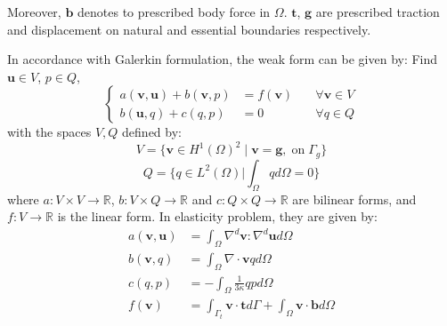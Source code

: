 Moreover, $\boldsymbol b$ denotes to prescribed body force in $\Omega$. $\boldsymbol t$, $\boldsymbol g$ are prescribed traction and displacement on natural and essential boundaries respectively. 

In accordance with Galerkin formulation, the weak form can be given by: 
Find $\boldsymbol u \in V$, $p \in Q$,
\begin{equation}\label{weak_form}
\left \{
\begin{aligned}
    a(\boldsymbol v, \boldsymbol u) + b(\boldsymbol v, p) &= f(\boldsymbol v) \quad &\forall \boldsymbol v \in V \\
    b(\boldsymbol u, q) + c(q,p) &= 0 \quad &\forall q \in Q
\end{aligned}
\right .
\end{equation}
with the spaces $V, Q$ defined by:
\begin{equation}\label{mix_formulation}
V=\{\boldsymbol v \in H^1(\Omega)^2\;\vert\;\boldsymbol v = \boldsymbol g, \; \textrm{on} \; \Gamma_g\}
\end{equation}
\begin{equation}
Q = \{q \in L^2(\Omega) \vert \int_{\Omega} q d\Omega = 0\}
\end{equation}
where $a:V\times V\rightarrow \mathbb R$, $b:V\times Q\rightarrow \mathbb R$ and $c:Q\times Q \rightarrow \mathbb R$ are bilinear forms, and $f:V\rightarrow \mathbb R$ is the linear form. In elasticity problem, they are given by:
\begin{align}
    a(\boldsymbol v, \boldsymbol u) &= \int_\Omega \nabla^d \boldsymbol v : \nabla^d \boldsymbol u d\Omega \\
    b(\boldsymbol v, q) &= \int_\Omega \nabla \cdot \boldsymbol v q d\Omega \\
    \label{form_c}
    c(q,p) &= -\int_\Omega \frac{1}{3\kappa} qpd\Omega \\
    f(\boldsymbol v) &= \int_{\Gamma_t} \boldsymbol v \cdot \boldsymbol t d\Gamma + \int_{\Omega} \boldsymbol v \cdot \boldsymbol b d\Omega
\end{align}

